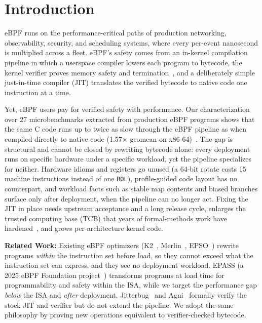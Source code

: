 \section{Introduction}

eBPF runs on the performance-critical paths of production networking, observability, security, and scheduling systems, where every per-event nanosecond is multiplied across a fleet.  eBPF's safety comes from an in-kernel compilation pipeline in which a userspace compiler lowers each program to bytecode, the kernel verifier proves memory safety and termination~\cite{gershuni2019simple}, and a deliberately simple just-in-time compiler (JIT) translates the verified bytecode to native code one instruction at a time.

Yet, eBPF users pay for verified safety with performance.  Our characterization over 27 microbenchmarks extracted from production eBPF programs shows that the same C code runs up to twice as slow through the eBPF pipeline as when compiled directly to native code (1.57$\times$ geomean on x86-64)~\cite{zheng2026kinsn}.  The gap is structural and cannot be closed by rewriting bytecode alone: every deployment runs on specific hardware under a specific workload, yet the pipeline specializes for neither. Hardware idioms and registers go unused (a 64-bit rotate costs 15 machine instructions instead of one \texttt{ROL}), profile-guided code layout has no counterpart, and workload facts such as stable map contents and biased branches surface only after deployment, when the pipeline can no longer act.  Fixing the JIT in place needs upstream acceptance and a long release cycle, enlarges the trusted computing base (TCB) that years of formal-methods work have hardened~\cite{nelson2020specification,vishwanathan2023verifying}, and grows per-architecture kernel code.

\noindent\textbf{Related Work:} Existing eBPF optimizers (K2~\cite{xu2021synthesizing}, Merlin~\cite{mao2024merlin}, EPSO~\cite{zhu2025epso}) rewrite programs \emph{within} the instruction set before load, so they cannot exceed what the instruction set can express, and they see no deployment workload.  EPASS (a 2025 eBPF Foundation project~\cite{huang2025epass}) transforms programs at load time for programmability and safety within the ISA, while we target the performance gap \emph{below} the ISA and \emph{after} deployment.  Jitterbug~\cite{nelson2020specification} and Agni~\cite{vishwanathan2023verifying} formally verify the stock JIT and verifier but do not extend the pipeline. We adopt the same philosophy by proving new operations equivalent to verifier-checked bytecode.
